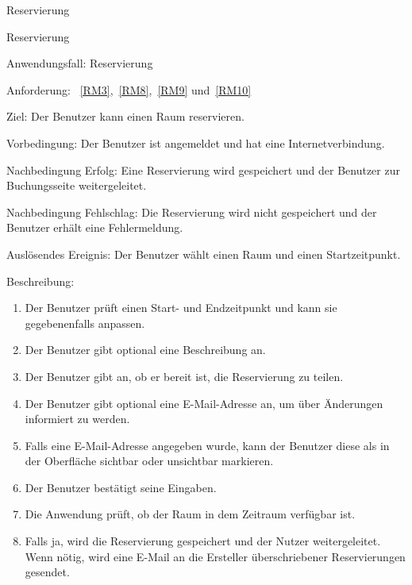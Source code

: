 \begin{function}{20}{Reservierung}

\begin{function}{30}{Reservierung}
    \item[Anwendungsfall:] Reservierung
    \item[Anforderung:]~\ref{RM3},~\ref{RM8},~\ref{RM9} und~\ref{RM10}
    \item[Ziel:] Der Benutzer kann einen Raum reservieren.
    \item[Vorbedingung:] Der Benutzer ist angemeldet und hat eine Internetverbindung.
    \item[Nachbedingung Erfolg:] Eine Reservierung wird gespeichert und der Benutzer zur Buchungsseite weitergeleitet.
    \item[Nachbedingung Fehlschlag:] Die Reservierung wird nicht gespeichert und der Benutzer erhält eine Fehlermeldung.
    \item[Auslösendes Ereignis:] Der Benutzer wählt einen Raum und einen Startzeitpunkt.
    \item[Beschreibung:] ~
    \begin{enumerate}
        \item Der Benutzer prüft einen Start- und Endzeitpunkt und kann sie gegebenenfalls anpassen.
        \item Der Benutzer gibt optional eine Beschreibung an.
        \item Der Benutzer gibt an, ob er bereit ist, die Reservierung zu teilen.
        \item Der Benutzer gibt optional eine E-Mail-Adresse an, um über Änderungen informiert zu werden.
        \item Falls eine E-Mail-Adresse angegeben wurde, kann der Benutzer diese als in der Oberfläche sichtbar oder unsichtbar markieren.
        \item Der Benutzer bestätigt seine Eingaben.
        \item Die Anwendung prüft, ob der Raum in dem Zeitraum verfügbar ist.
        \item Falls ja, wird die Reservierung gespeichert und der Nutzer weitergeleitet.
              Wenn nötig, wird eine E-Mail an die Ersteller überschriebener Reservierungen gesendet.
    \end{enumerate}
\end{function}


\end{function}
